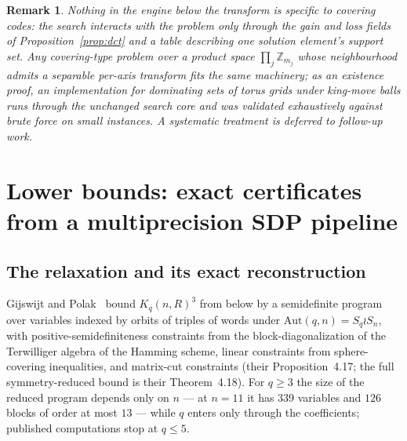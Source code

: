 \documentclass[11pt]{amsart}
\newtheorem{remark}[theorem]{Remark}
\begin{document}
\begin{remark}
Nothing in the engine below the transform is specific to covering codes:
the search interacts with the problem only through the gain and loss
fields of Proposition~\ref{prop:dct} and a table describing one solution
element's support set. Any covering-type problem over a product space
$\prod_j \mathbb{Z}_{m_j}$ whose neighbourhood admits a separable per-axis
transform fits the same machinery; as an existence proof, an
implementation for dominating sets of torus grids under king-move balls
runs through the unchanged search core and was validated exhaustively
against brute force on small instances. A systematic treatment is
deferred to follow-up work.
\end{remark}

\section{Lower bounds: exact certificates from a multiprecision
SDP pipeline}\label{sec:lb}

\subsection{The relaxation and its exact reconstruction}

Gijswijt and Polak~\cite{GijswijtPolak} bound $K_q(n,R)^3$ from below by a
semidefinite program over variables indexed by orbits of triples of words
under $\mathrm{Aut}(q,n)=S_q\wr S_n$, with positive-semidefiniteness
constraints from the block-diagonalization of the Terwilliger algebra of
the Hamming scheme, linear constraints from sphere-covering inequalities,
and matrix-cut constraints (their Proposition~4.17; the full
symmetry-reduced bound is their Theorem~4.18). For $q\ge 3$ the size of
the reduced program depends only on $n$ --- at $n=11$ it has $339$
variables and $126$ blocks of order at most $13$ --- while $q$ enters only
through the coefficients; published computations stop at $q\le 5$.
\end{document}
